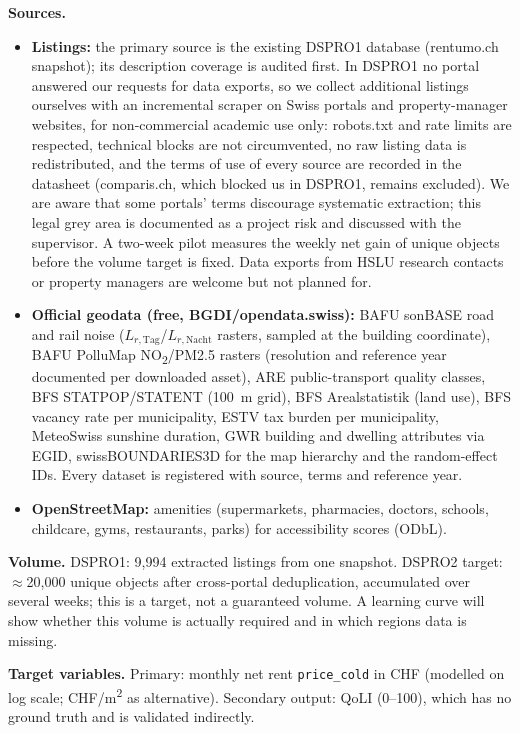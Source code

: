 \documentclass[11pt,a4paper]{article}
\begin{document}
\textbf{Sources.}
\begin{itemize}
    \item \textbf{Listings:} the primary source is the existing DSPRO1 database (rentumo.ch snapshot); its description coverage is audited first. In DSPRO1 no portal answered our requests for data exports, so we collect additional listings ourselves with an incremental scraper on Swiss portals and property-manager websites, for non-commercial academic use only: robots.txt and rate limits are respected, technical blocks are not circumvented, no raw listing data is redistributed, and the terms of use of every source are recorded in the datasheet (comparis.ch, which blocked us in DSPRO1, remains excluded). We are aware that some portals' terms discourage systematic extraction; this legal grey area is documented as a project risk and discussed with the supervisor. A two-week pilot measures the weekly net gain of unique objects before the volume target is fixed. Data exports from HSLU research contacts or property managers are welcome but not planned for.
    \item \textbf{Official geodata (free, BGDI/opendata.swiss):} BAFU sonBASE road and rail noise ($L_{r,\mathrm{Tag}}$/$L_{r,\mathrm{Nacht}}$ rasters, sampled at the building coordinate), BAFU PolluMap NO\textsubscript{2}/PM2.5 rasters (resolution and reference year documented per downloaded asset), ARE public-transport quality classes, BFS STATPOP/STATENT (100~m grid), BFS Arealstatistik (land use), BFS vacancy rate per municipality, ESTV tax burden per municipality, MeteoSwiss sunshine duration, GWR building and dwelling attributes via EGID, swissBOUNDARIES3D for the map hierarchy and the random-effect IDs. Every dataset is registered with source, terms and reference year.
    \item \textbf{OpenStreetMap:} amenities (supermarkets, pharmacies, doctors, schools, childcare, gyms, restaurants, parks) for accessibility scores (ODbL).
\end{itemize}

\textbf{Volume.} DSPRO1: 9{,}994 extracted listings from one snapshot. DSPRO2 target: $\approx$20{,}000 unique objects after cross-portal deduplication, accumulated over several weeks; this is a target, not a guaranteed volume. A learning curve will show whether this volume is actually required and in which regions data is missing.

\textbf{Target variables.} Primary: monthly net rent \texttt{price\_cold} in CHF (modelled on log scale; CHF/m\textsuperscript{2} as alternative). Secondary output: QoLI (0--100), which has no ground truth and is validated indirectly.
\end{document}
